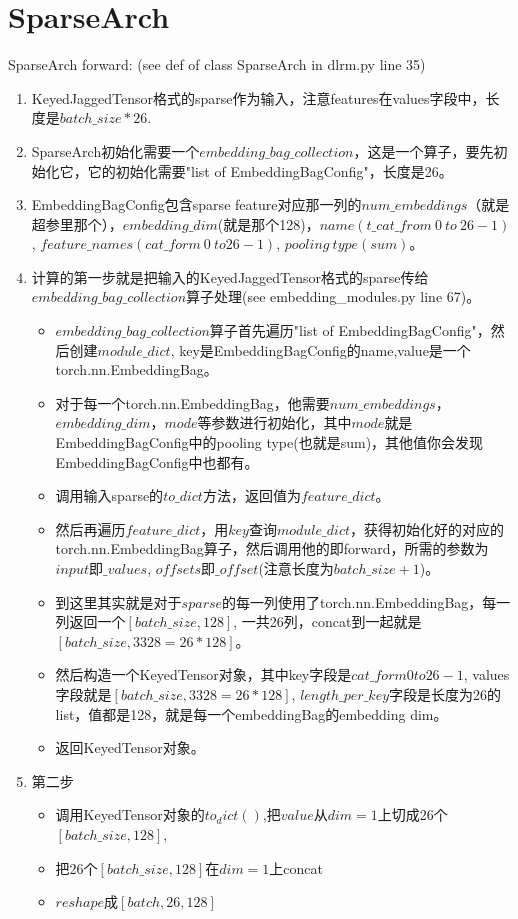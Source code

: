 \documentclass{article}
\begin{document}
\section{SparseArch}
SparseArch forward: (see def of class SparseArch in dlrm.py line 35)
\begin{enumerate}
    \item KeyedJaggedTensor格式的sparse作为输入，注意features在values字段中，长度是$batch\_size * 26$.
    \item SparseArch初始化需要一个$embedding\_bag\_collection$，这是一个算子，要先初始化它，它的初始化需要"list of EmbeddingBagConfig"，长度是26。
    \item EmbeddingBagConfig包含sparse feature对应那一列的$num\_embeddings$（就是超参里那个），$embedding\_dim$(就是那个128)，$name(t\_cat\_{from\ 0\ to\ 26-1})$, $feature\_names(cat\_{form\ 0\ to 26-1})$, $pooling\ type(sum)$。
    \item 计算的第一步就是把输入的KeyedJaggedTensor格式的sparse传给$embedding\_bag\_collection$算子处理(see embedding\_modules.py line 67)。
    \begin{itemize}
        \item $embedding\_bag\_collection$算子首先遍历"list of EmbeddingBagConfig"，然后创建$module\_dict$, key是EmbeddingBagConfig的name,value是一个torch.nn.EmbeddingBag。
        \item 对于每一个torch.nn.EmbeddingBag，他需要$num\_embeddings$，$embedding\_dim$，$mode$等参数进行初始化，其中$mode$就是EmbeddingBagConfig中的pooling type(也就是sum)，其他值你会发现EmbeddingBagConfig中也都有。
        \item 调用输入sparse的$to\_dict$方法，返回值为$feature\_dict$。
        \item 然后再遍历$feature\_dict$，用$key$查询$module\_dict$，获得初始化好的对应的torch.nn.EmbeddingBag算子，然后调用他的即forward，所需的参数为$input$即$\_values$, $offsets$即$\_offset$(注意长度为$batch\_size+1$)。
        \item 到这里其实就是对于$sparse$的每一列使用了torch.nn.EmbeddingBag，每一列返回一个$[batch\_size, 128]$, 一共26列，concat到一起就是$[batch\_size, 3328=26*128]$。
        \item 然后构造一个KeyedTensor对象，其中key字段是$cat\_{form 0 to 26-1}$, values字段就是$[batch\_size, 3328=26*128]$, $length\_per\_key$字段是长度为26的list，值都是128，就是每一个embeddingBag的embedding dim。
        \item 返回KeyedTensor对象。
    \end{itemize}
    \item 第二步
    \begin{itemize}
        \item 调用KeyedTensor对象的$to_dict()$,把$value$从$dim=1$上切成26个$[batch\_size, 128]$,
        \item 把26个$[batch\_size, 128]$在$dim=1$上concat
        \item $reshape$成$[batch, 26, 128]$
    \end{itemize}
\end{enumerate}
\end{document}
